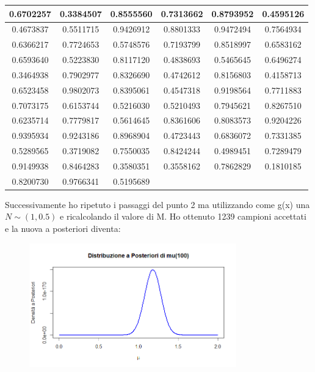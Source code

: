 \documentclass[a4paper,12pt]{article}
\begin{document}
\begin{itemize}
\begin{center}
\begin{tabular}{|c|c|c|c|c|c|}
			\hline
			0.6702257 & 0.3384507 & 0.8555560 & 0.7313662 & 0.8793952 & 0.4595126 \\
			\hline
			0.4673837 & 0.5511715 & 0.9426912 & 0.8801333 & 0.9472494 & 0.7564934 \\
			\hline
			0.6366217 & 0.7724653 & 0.5748576 & 0.7193799 & 0.8518997 & 0.6583162 \\
			\hline
			0.6593640 & 0.5223830 & 0.8117120 & 0.4838693 & 0.5465645 & 0.6496274 \\
			\hline
			0.3464938 & 0.7902977 & 0.8326690 & 0.4742612 & 0.8156803 & 0.4158713 \\
			\hline
			0.6523458 & 0.9802073 & 0.8395061 & 0.4547318 & 0.9198564 & 0.7711883 \\
			\hline
			0.7073175 & 0.6153744 & 0.5216030 & 0.5210493 & 0.7945621 & 0.8267510 \\
			\hline
			0.6235714 & 0.7779817 & 0.5614645 & 0.8361606 & 0.8083573 & 0.9204226 \\
			\hline
			0.9395934 & 0.9243186 & 0.8968904 & 0.4723443 & 0.6836072 & 0.7331385 \\
			\hline
			0.5289565 & 0.3719082 & 0.7550035 & 0.8424244 & 0.4989451 & 0.7289479 \\
			\hline
			0.9149938 & 0.8464283 & 0.3580351 & 0.3558162 & 0.7862829 & 0.1810185 \\
			\hline
			0.8200730 & 0.9766341 & 0.5195689 & & & \\
			\hline
		\end{tabular}
	\end{center}
	Successivamente ho ripetuto i passaggi del punto 2 ma utilizzando come g(x) una $N \sim (1,0.5)$ e ricalcolando il valore di M.
	Ho ottenuto 1239 campioni accettati e la nuova a posteriori diventa:
	\begin{figure}[h] %
		\centering %
		\includegraphics[width=0.8\textwidth]{newpost.png} %

\end{figure}
\end{itemize}
\end{document}
